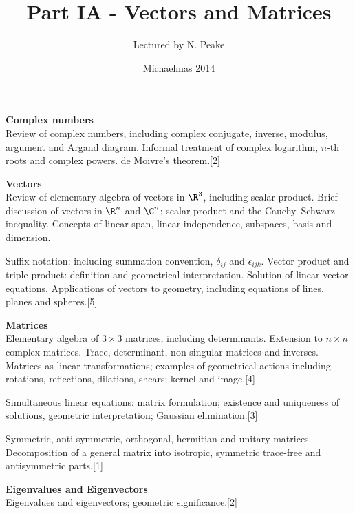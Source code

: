 \documentclass[a4paper]{article}
\title{Part IA - Vectors and Matrices}
\author{Lectured by N. Peake}
\date{Michaelmas 2014}
\begin{document}
\maketitle
{\small \noindent\textbf{Complex numbers}\\
Review of complex numbers, including complex conjugate, inverse, modulus, argument and Argand diagram. Informal treatment of complex logarithm, $n$-th roots and complex powers. de Moivre's theorem.\hspace*{\fill}[2]

\vspace{10pt}
\noindent\textbf{Vectors}\\
Review of elementary algebra of vectors in $\R^3$, including scalar product. Brief discussion of vectors in $\R^n$ and $\C^n$; scalar product and the Cauchy–Schwarz inequality. Concepts of linear span, linear independence, subspaces, basis and dimension.

\vspace{5pt}
\noindent Suffix notation: including summation convention, $\delta_{ij}$ and $\epsilon_{ijk}$. Vector product and triple product: definition and geometrical interpretation. Solution of linear vector equations. Applications of vectors to geometry, including equations of lines, planes and spheres.\hspace*{\fill}[5]

\vspace{10pt}
\noindent\textbf{Matrices}\\
Elementary algebra of $3\times 3$ matrices, including determinants. Extension to $n\times n$ complex matrices. Trace, determinant, non-singular matrices and inverses. Matrices as linear transformations; examples of geometrical actions including rotations, reflections, dilations, shears; kernel and image.\hspace*{\fill}[4]

\vspace{5pt}
\noindent Simultaneous linear equations: matrix formulation; existence and uniqueness of solutions, geometric interpretation; Gaussian elimination.\hspace*{\fill}[3]

\vspace{5pt}
\noindent Symmetric, anti-symmetric, orthogonal, hermitian and unitary matrices. Decomposition of a general matrix into isotropic, symmetric trace-free and antisymmetric parts.\hspace*{\fill}[1]

\vspace{10pt}
\noindent\textbf{Eigenvalues and Eigenvectors}\\
Eigenvalues and eigenvectors; geometric significance.\hspace*{\fill}[2]

}
\end{document}
